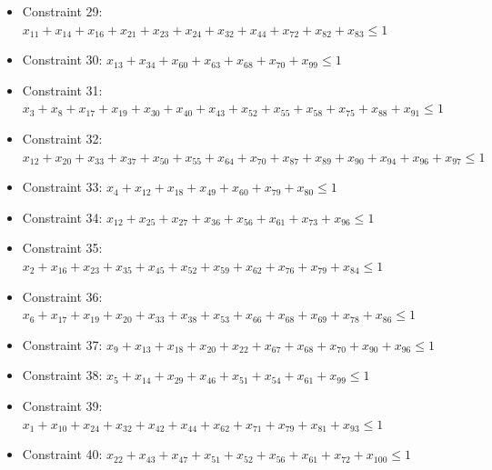 \documentclass[11pt]{article}
\begin{document}
\begin{itemize}
\item Constraint 29: $x_{11} + x_{14} + x_{16} + x_{21} + x_{23} + x_{24} + x_{32} + x_{44} + x_{72} + x_{82} + x_{83} \le 1$
\item Constraint 30: $x_{13} + x_{34} + x_{60} + x_{63} + x_{68} + x_{70} + x_{99} \le 1$
\item Constraint 31: $x_{3} + x_{8} + x_{17} + x_{19} + x_{30} + x_{40} + x_{43} + x_{52} + x_{55} + x_{58} + x_{75} + x_{88} + x_{91} \le 1$
\item Constraint 32: $x_{12} + x_{20} + x_{33} + x_{37} + x_{50} + x_{55} + x_{64} + x_{70} + x_{87} + x_{89} + x_{90} + x_{94} + x_{96} + x_{97} \le 1$
\item Constraint 33: $x_{4} + x_{12} + x_{18} + x_{49} + x_{60} + x_{79} + x_{80} \le 1$
\item Constraint 34: $x_{12} + x_{25} + x_{27} + x_{36} + x_{56} + x_{61} + x_{73} + x_{96} \le 1$
\item Constraint 35: $x_{2} + x_{16} + x_{23} + x_{35} + x_{45} + x_{52} + x_{59} + x_{62} + x_{76} + x_{79} + x_{84} \le 1$
\item Constraint 36: $x_{6} + x_{17} + x_{19} + x_{20} + x_{33} + x_{38} + x_{53} + x_{66} + x_{68} + x_{69} + x_{78} + x_{86} \le 1$
\item Constraint 37: $x_{9} + x_{13} + x_{18} + x_{20} + x_{22} + x_{67} + x_{68} + x_{70} + x_{90} + x_{96} \le 1$
\item Constraint 38: $x_{5} + x_{14} + x_{29} + x_{46} + x_{51} + x_{54} + x_{61} + x_{99} \le 1$
\item Constraint 39: $x_{1} + x_{10} + x_{24} + x_{32} + x_{42} + x_{44} + x_{62} + x_{71} + x_{79} + x_{81} + x_{93} \le 1$
\item Constraint 40: $x_{22} + x_{43} + x_{47} + x_{51} + x_{52} + x_{56} + x_{61} + x_{72} + x_{100} \le 1$
\end{itemize}
\end{document}
